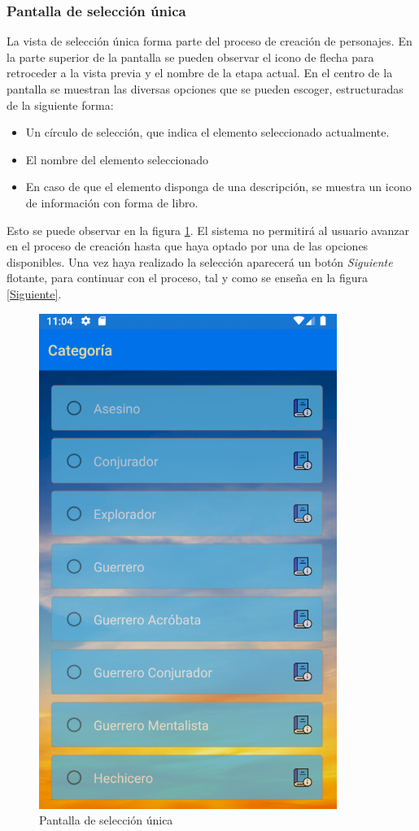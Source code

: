 \subsubsection{Pantalla de selección única}
La vista de selección única forma parte del proceso de creación de personajes. En la parte superior de la 
pantalla se pueden observar el icono de flecha para retroceder a la vista previa y el nombre de la etapa actual.
En el centro de la pantalla se muestran las diversas opciones que se pueden escoger, estructuradas de la siguiente forma:
\begin{itemize}
    \item Un círculo de selección, que indica el elemento seleccionado actualmente.
    \item El nombre del elemento seleccionado
    \item En caso de que el elemento disponga de una descripción, se muestra un icono de información con forma de libro.
\end{itemize}
Esto se puede observar en la figura \ref*{SeleccionUnica}. El sistema no permitirá al usuario avanzar en el proceso de creación 
hasta que haya optado por una de las opciones disponibles. Una vez haya realizado la selección aparecerá un botón \textit{Siguiente}
flotante, para continuar con el proceso, tal y como se enseña en la figura \ref*{Siguiente}.

\begin{figure}[H]
    \centering
    \includegraphics[scale=0.3]{Figures/Capturas/SeleccionUnica.png}
    \caption{Pantalla de selección única}
    \label{SeleccionUnica}    
\end{figure}

